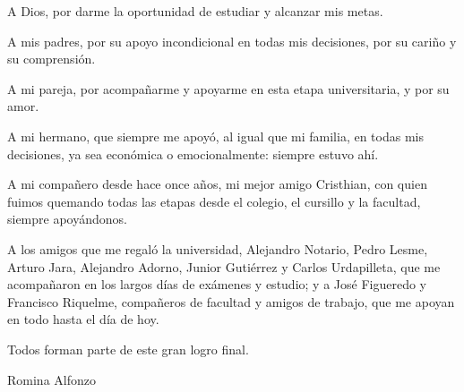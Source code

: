 \vspace*{\fill}

\begin{flushright}
\begin{minipage}{0.78\textwidth}
\itshape
\setlength{\parskip}{0.6\baselineskip}

A Dios, por darme la oportunidad de estudiar y alcanzar mis metas.

A mis padres, por su apoyo incondicional en todas mis decisiones, por su cariño y su comprensión.

A mi pareja, por acompañarme y apoyarme en esta etapa universitaria, y por su amor.

A mi hermano, que siempre me apoyó, al igual que mi familia, en todas mis decisiones, ya sea económica o emocionalmente: siempre estuvo ahí.

A mi compañero desde hace once años, mi mejor amigo Cristhian, con quien fuimos quemando todas las etapas desde el colegio, el cursillo y la facultad, siempre apoyándonos.

A los amigos que me regaló la universidad, Alejandro Notario, Pedro Lesme, Arturo Jara, Alejandro Adorno, Junior Gutiérrez y Carlos Urdapilleta, que me acompañaron en los largos días de exámenes y estudio; y a José Figueredo y Francisco Riquelme, compañeros de facultad y amigos de trabajo, que me apoyan en todo hasta el día de hoy.

Todos forman parte de este gran logro final.

\upshape
\hfill Romina Alfonzo
\end{minipage}
\end{flushright}

\vspace*{\fill}
